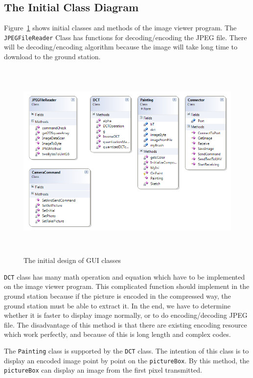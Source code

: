 \subsection*{The Initial Class Diagram}
Figure~\ref{ini_Class} shows initial classes and methods of the image viewer program.
The \texttt{JPEGFileReader} Class has functions for decoding/encoding the JPEG file.
There will be decoding/encoding algorithm because the image will take long time to download to the ground station. 
\begin{center}
\begin{figure}[!hbtp]
\includegraphics[width=150mm,height=100mm]{figures/initialClassDiagram.png} 
\caption{The initial design of GUI classes\label{ini_Class}}
\end{figure}
\end{center}
\texttt{DCT} class has many math operation and equation which have to be implemented on the image viewer program. 
This complicated function should implement in the ground station because if the picture is encoded in the compressed way, the ground station must be able to extract it. 
In the end, we have to determine whether it is faster to display image normally, or to do encoding/decoding JPEG file. 
The disadvantage of this method is that there are existing encoding resource which work perfectly, and because of this is long length and complex codes.

The \texttt{Painting} class is supported by the \texttt{DCT} class. The intention of this class is to display an encoded image point by point on the \texttt{pictureBox}.
By this method, the \texttt{pictureBox} can display an image from the first pixel transmitted.


